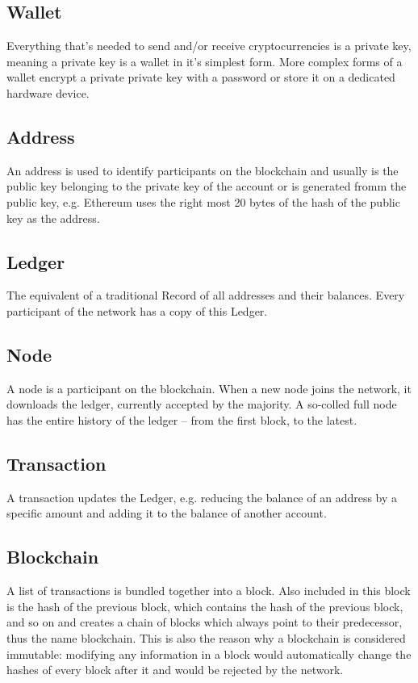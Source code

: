 \subsection{Wallet}
Everything that’s needed to send and/or receive cryptocurrencies is a private key\cite{bitcoin-whitepaper}, meaning a private key is a wallet in it’s simplest form. More complex forms of a wallet encrypt a private private key with a password or store it on a dedicated hardware device.
\\

\subsection{Address}
An address is used to identify participants on the blockchain and usually is the public key belonging to the private key of the account or is generated fromm the public key, e.g. Ethereum  uses the right most 20 bytes of the hash of the public key as the address\cite{ethereum-yellow-paper}.
\\

\subsection{Ledger}
The equivalent of a traditional Record of all addresses and their balances. Every participant of the network has a copy of this Ledger.
\\

\subsection{Node}
A node is a participant on the blockchain. When a new node joins the network, it downloads the ledger, currently accepted by the majority. A so-colled full node has the entire history of the ledger – from the first block, to the latest.
\\

\subsection{Transaction}
A transaction updates the Ledger, e.g. reducing the balance of an address by a specific amount and adding it to the balance of another account.
\\

\subsection{Blockchain}
A list of transactions is bundled together into a block. Also included in this block is the hash of the previous block, which contains the hash of the previous block, and so on and creates a chain of blocks\cite{bitcoin-whitepaper} which always point to their predecessor, thus the name blockchain. This is also the reason why a blockchain is considered immutable: modifying any information in a block would automatically change the hashes of every block after it and would be rejected by the network.
\\

